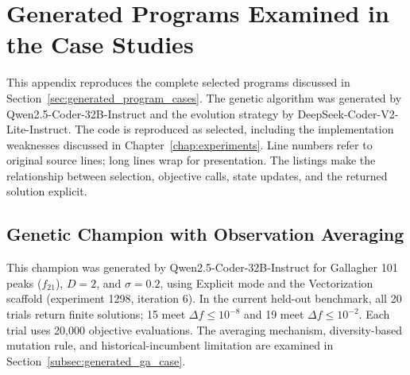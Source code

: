 \chapter{Generated Programs Examined in the Case Studies}
\label{app:generated_programs}

This appendix reproduces the complete selected programs discussed in
Section~\ref{sec:generated_program_cases}. The genetic algorithm was generated
by Qwen2.5-Coder-32B-Instruct and the evolution strategy by
DeepSeek-Coder-V2-Lite-Instruct.
The code is reproduced as selected, including the implementation weaknesses
discussed in Chapter~\ref{chap:experiments}. Line numbers refer to original
source lines; long lines wrap for presentation. The listings make the
relationship between selection, objective calls, state updates, and the
returned solution explicit.

\section{Genetic Champion with Observation Averaging}

This champion was generated by Qwen2.5-Coder-32B-Instruct for
Gallagher 101 peaks ($f_{21}$), $D=2$, and $\sigma=0.2$, using Explicit
mode and the Vectorization scaffold (experiment 1298, iteration 6).
In the current held-out benchmark, all 20 trials return finite solutions;
15 meet $\Delta f\leq10^{-8}$ and 19 meet $\Delta f\leq10^{-2}$.
Each trial uses 20,000 objective evaluations. The averaging mechanism,
diversity-based mutation rule, and historical-incumbent limitation are
examined in Section~\ref{subsec:generated_ga_case}.

